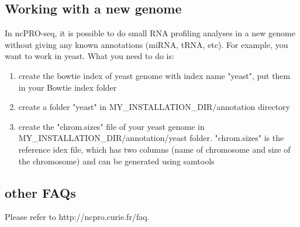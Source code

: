 \documentclass[12pt]{article}
\def \ncpip{ncPRO-seq}
\begin{document}
\subsection{Working with a new genome}

In \ncpip{}, it is possible to do small RNA profiling analyses in a new genome without giving any known annotations (miRNA, tRNA, etc). For example, you want to work in yeast. What you need to do is:
\begin{enumerate}
 \item create the bowtie index of yeast genome with index name "yeast", put them in your Bowtie index folder
 \item create a folder "yeast" in MY\_INSTALLATION\_DIR/annotation directory
 \item create the "chrom.sizes" file of your yeast genome in MY\_INSTALLATION\_DIR/annotation/yeast folder. "chrom.sizes" is the reference idex file, which has two columns (name of chromosome and size of the chromosome) and can be generated using samtools 
\end{enumerate}

\subsection{other FAQs}
 
Please refer to http://ncpro.curie.fr/faq.




\nocite{*}
\end{document}
